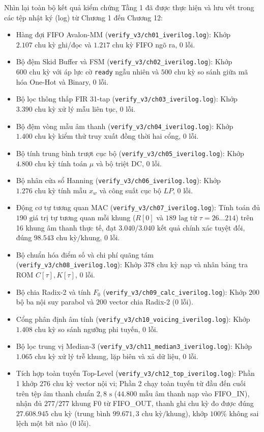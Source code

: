 Nhìn lại toàn bộ kết quả kiểm chứng Tầng 1 đã được thực hiện và lưu vết trong các tệp nhật ký (log) từ Chương 1 đến Chương 12:
\begin{itemize}
    \item Hàng đợi FIFO Avalon-MM (\texttt{verify\_v3/ch01\_iverilog.log}): Khớp $2.107\text{ chu kỳ}$ ghi/đọc và $1.217\text{ chu kỳ}$ FIFO ngõ ra, $0\text{ lỗi}$.
    \item Bộ đệm Skid Buffer và FSM (\texttt{verify\_v3/ch02\_iverilog.log}): Khớp $600\text{ chu kỳ}$ với áp lực cờ \texttt{ready} ngẫu nhiên và $500\text{ chu kỳ}$ so sánh giữa mã hóa One-Hot và Binary, $0\text{ lỗi}$.
    \item Bộ lọc thông thấp FIR 31-tap (\texttt{verify\_v3/ch03\_iverilog.log}): Khớp $3.390\text{ chu kỳ}$ xử lý mẫu liên tục, $0\text{ lỗi}$.
    \item Bộ đệm vòng mẫu âm thanh (\texttt{verify\_v3/ch04\_iverilog.log}): Khớp $1.400\text{ chu kỳ}$ kiểm thử truy xuất đồng thời hai cổng, $0\text{ lỗi}$.
    \item Bộ tính trung bình trượt cục bộ (\texttt{verify\_v3/ch05\_iverilog.log}): Khớp $4.800\text{ chu kỳ}$ tính toán $\mu$ và bộ triệt DC, $0\text{ lỗi}$.
    \item Bộ nhân cửa sổ Hanning (\texttt{verify\_v3/ch06\_iverilog.log}): Khớp $1.276\text{ chu kỳ}$ tính mẫu $x_w$ và công suất cục bộ $LP$, $0\text{ lỗi}$.
    \item Động cơ tự tương quan MAC (\texttt{verify\_v3/ch07\_iverilog.log}): Tính toán đủ $190\text{ giá trị}$ tự tương quan mỗi khung ($R[0]$ và $189\text{ lag}$ từ $\tau = 26 \dots 214$) trên 16 khung âm thanh thực tế, đạt $3.040/3.040\text{ kết quả}$ chính xác tuyệt đối, đúng $98.543\text{ chu kỳ/khung}$, $0\text{ lỗi}$.
    \item Bộ chuẩn hóa điểm số và chi phí quãng tám (\texttt{verify\_v3/ch08\_iverilog.log}): Khớp $378\text{ chu kỳ}$ nạp và nhân bảng tra ROM $C[\tau], K[\tau]$, $0\text{ lỗi}$.
    \item Bộ chia Radix-2 và tính $F_0$ (\texttt{verify\_v3/}\allowbreak\texttt{ch09\_calc\_}\allowbreak\texttt{iverilog.log}): Khớp $200$ bộ ba nội suy parabol và $200$ vector chia Radix-2 ($0\text{ lỗi}$).
    \item Cổng phân định âm tính (\texttt{verify\_v3/ch10\_voicing\_iverilog.log}): Khớp $1.408\text{ chu kỳ}$ so sánh ngưỡng phi tuyến, $0\text{ lỗi}$.
    \item Bộ lọc trung vị Median-3 (\texttt{verify\_v3/ch11\_median3\_iverilog.log}): Khớp $1.065\text{ chu kỳ}$ xử lý trễ khung, lặp biên và xả dữ liệu, $0\text{ lỗi}$.
    \item Tích hợp toàn tuyến Top-Level (\texttt{verify\_v3/ch12\_top\_iverilog.log}): Phần 1 khớp $276\text{ chu kỳ}$ vector nội vi; Phần 2 chạy toàn tuyến từ đầu đến cuối trên tệp âm thanh chuẩn $2{,}8\text{ s}$ ($44.800\text{ mẫu}$ âm thanh nạp vào FIFO\_IN), nhận đủ $277/277\text{ khung}$ F0 từ FIFO\_OUT, thanh ghi chu kỳ đo được đúng $27.608.945\text{ chu kỳ}$ (trung bình $99.671{,}3\text{ chu kỳ/khung}$), khớp $100\%$ không sai lệch một bit nào ($0\text{ lỗi}$).
\end{itemize}

